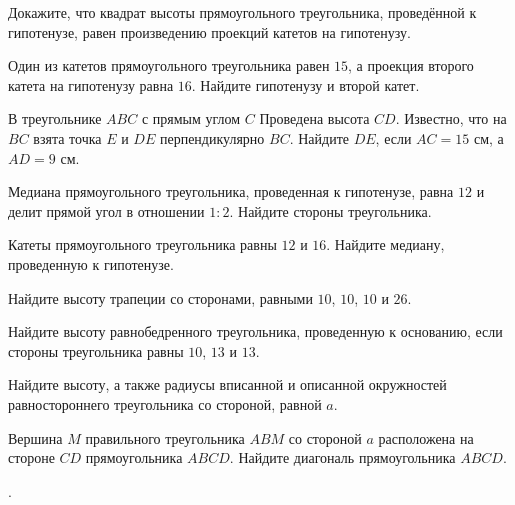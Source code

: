 \begin{class}[number=2]
	\begin{listofex}
		\item Докажите, что квадрат высоты прямоугольного треугольника, проведённой к гипотенузе, равен произведению проекций катетов на гипотенузу.
		\item Один из катетов прямоугольного треугольника равен \( 15 \), а проекция второго катета на гипотенузу равна \( 16 \). Найдите гипотенузу и второй катет.
		\item В треугольнике \( ABC \) с прямым углом \( C \) Проведена высота \( CD \). Известно, что на \( BC \) взята точка \( E \) и \( DE \) перпендикулярно \( BC \). Найдите \( DE \), если \( AC=15 \) см, а \( AD=9 \) см.	
		\item Медиана прямоугольного треугольника, проведенная к гипотенузе, равна \( 12 \) и делит прямой угол в отношении \( 1:2 \). Найдите стороны треугольника.
		\item Катеты прямоугольного треугольника равны \( 12 \) и \( 16 \). Найдите медиану, проведенную к гипотенузе.
		\item Найдите высоту трапеции со сторонами, равными \( 10 \), \( 10 \), \( 10 \) и \( 26 \).
		\item Найдите высоту равнобедренного треугольника, проведенную к основанию, если стороны треугольника равны \( 10 \), \( 13 \) и \( 13 \).
		\item Найдите высоту, а также радиусы вписанной и описанной окружностей равностороннего треугольника со стороной, равной \( a \).
		\item Вершина \( M \) правильного треугольника \( ABM \) со стороной \( a \) расположена на стороне \( CD \) прямоугольника \( ABCD \).	Найдите диагональ прямоугольника \( ABCD \).
	\end{listofex}
\end{class}

\begin{homework}[number=1]
	\begin{listofex}
		\item .
	\end{listofex}
\end{homework}

